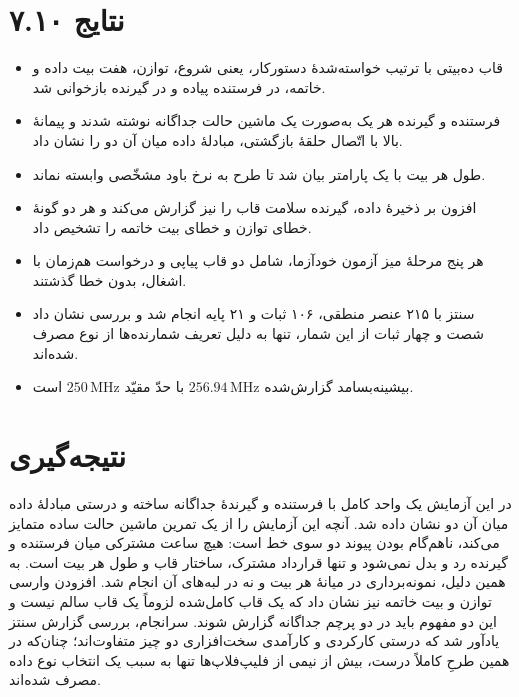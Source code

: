 \documentclass[12pt,a4paper]{article}
\begin{document}
	\section*{۷.۱۰ نتایج}
	\begin{itemize}
		\item قاب ده‌بیتی با ترتیب خواسته‌شدهٔ دستورکار، یعنی شروع، توازن، هفت بیت داده و خاتمه، در فرستنده پیاده و در گیرنده بازخوانی شد.
		\item فرستنده و گیرنده هر یک به‌صورت یک ماشین حالت جداگانه نوشته شدند و پیمانهٔ بالا با اتّصال حلقهٔ بازگشتی، مبادلهٔ داده میان آن دو را نشان داد.
		\item طول هر بیت با یک پارامتر بیان شد تا طرح به نرخ باود مشخّصی وابسته نماند.
		\item افزون بر ذخیرهٔ داده، گیرنده سلامت قاب را نیز گزارش می‌کند و هر دو گونهٔ خطای توازن و خطای بیت خاتمه را تشخیص داد.
		\item هر پنج مرحلهٔ میز آزمون خودآزما، شامل دو قاب پیاپی و درخواست هم‌زمان با اشغال، بدون خطا گذشتند.
		\item سنتز با ۲۱۵ عنصر منطقی، ۱۰۶ ثبات و ۲۱ پایه انجام شد و بررسی نشان داد شصت و چهار ثبات از این شمار، تنها به دلیل تعریف شمارنده‌ها از نوع  مصرف شده‌اند.
		\item بیشینه‌بسامد گزارش‌شده \(256.94\,\mathrm{MHz}\) با حدّ مقیّد \(250\,\mathrm{MHz}\) است.
	\end{itemize}

	\section*{نتیجه‌گیری}
	در این آزمایش یک واحد  کامل با فرستنده و گیرندهٔ جداگانه ساخته و درستی مبادلهٔ داده میان آن دو نشان داده شد. آنچه این آزمایش را از یک تمرین ماشین حالت ساده متمایز می‌کند، ناهم‌گام بودن پیوند دو سوی خط است: هیچ ساعت مشترکی میان فرستنده و گیرنده رد و بدل نمی‌شود و تنها قرارداد مشترک، ساختار قاب و طول هر بیت است. به همین دلیل، نمونه‌برداری در میانهٔ هر بیت و نه در لبه‌های آن انجام شد. افزودن وارسی توازن و بیت خاتمه نیز نشان داد که یک قاب کامل‌شده لزوماً یک قاب سالم نیست و این دو مفهوم باید در دو پرچم جداگانه گزارش شوند. سرانجام، بررسی گزارش سنتز یادآور شد که درستی کارکردی و کارآمدی سخت‌افزاری دو چیز متفاوت‌اند؛ چنان‌که در همین طرحِ کاملاً درست، بیش از نیمی از فلیپ‌فلاپ‌ها تنها به سبب یک انتخاب نوع داده مصرف شده‌اند.
\end{document}
